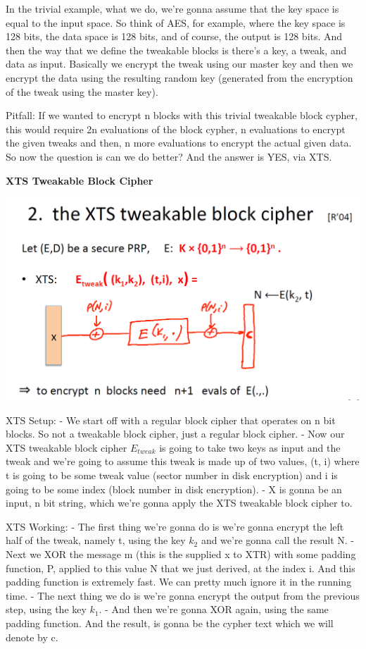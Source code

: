 \documentclass[11pt]{article}
\makeatletter
\def\maxwidth{\ifdim\Gin@nat@width>\linewidth\linewidth
    \else\Gin@nat@width\fi}
\let\Oldincludegraphics\includegraphics
\renewcommand{\includegraphics}[1]{\Oldincludegraphics[width=.8\maxwidth]{#1}}
\makeatother
\begin{document}
In the trivial example, what we do, we're gonna assume that the key
space is equal to the input space. So think of AES, for example, where
the key space is 128 bits, the data space is 128 bits, and of course,
the output is 128 bits. And then the way that we define the tweakable
blocks is there's a key, a tweak, and data as input. Basically we
encrypt the tweak using our master key and then we encrypt the data
using the resulting random key (generated from the encryption of the
tweak using the master key).

Pitfall: If we wanted to encrypt n blocks with this trivial tweakable
block cypher, this would require 2n evaluations of the block cypher, n
evaluations to encrypt the given tweaks and then, n more evaluations to
encrypt the actual given data. So now the question is can we do better?
And the answer is YES, via XTS.

\textbf{XTS Tweakable Block Cipher}

\includegraphics{./Images/XTS-TBC.png}

XTS Setup: - We start off with a regular block cipher that operates on n
bit blocks. So not a tweakable block cipher, just a regular block
cipher. - Now our XTS tweakable block cipher \(E_{tweak}\) is going to
take two keys as input and the tweak and we're going to assume this
tweak is made up of two values, (t, i) where t is going to be some tweak
value (sector number in disk encryption) and i is going to be some index
(block number in disk encryption). - X is gonna be an input, n bit
string, which we're gonna apply the XTS tweakable block cipher to.

XTS Working: - The first thing we're gonna do is we're gonna encrypt the
left half of the tweak, namely t, using the key \(k_{2}\) and we're
gonna call the result N. - Next we XOR the message m (this is the
supplied x to XTR) with some padding function, P, applied to this value
N that we just derived, at the index i. And this padding function is
extremely fast. We can pretty much ignore it in the running time. - The
next thing we do is we're gonna encrypt the output from the previous
step, using the key \(k_{1}\). - And then we're gonna XOR again, using
the same padding function. And the result, is gonna be the cypher text
which we will denote by c.
\end{document}
